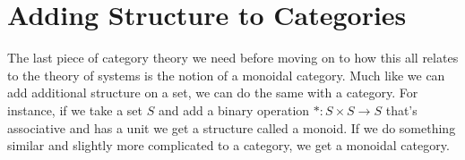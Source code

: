 \documentclass[12pt]{article}
\theoremstyle{definition}
\begin{document}
\pagebreak
\section*{Adding Structure to Categories}
The last piece of category theory we need before moving on to how this all relates to the theory of systems is the notion of a monoidal category.
Much like we can add additional structure on a set, we can do the same with a category.
For instance, if we take a set $S$ and add a binary operation $*:S \times S \rightarrow S$ that's associative and has a unit we get a structure called a monoid.
If we do something similar and slightly more complicated to a category, we get a monoidal category.
\end{document}
